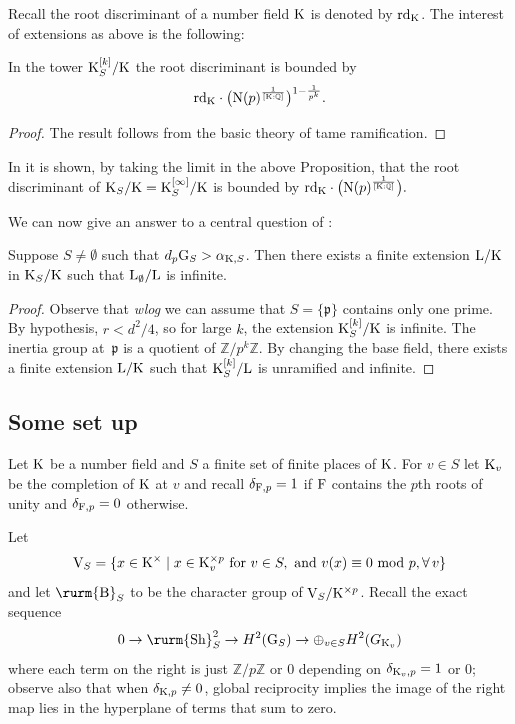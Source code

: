 \documentclass[12pt,a4paper,twoside,english]{smfart}
\def\Q{{\mathbb Q}}
\def\Z{{\mathbb Z}}
\def\p{{\mathfrak p}}
\def\sha{{{\textnormal{\rurm{Sh}}}}}
\def\CyB{{{\textnormal{\rurm{B}}}}}
\def\N{{\rm N}}
\def\G{{\rm G}}
\def\K{{\rm K}}
\def\L{{\rm L}}
\def\F{{\rm F}}
\def\V{{\rm V}}
\def\rd{{\rm rd}}
\begin{document}
  
Recall the root discriminant of a number field $\K$ is denoted by  $\rd_\K$.
  The interest of extensions as above is the following:
  
  \begin{prop}
  In the tower $\K_S^{[k]}/\K$ the root discriminant is bounded by $$\rd_\K \cdot  \big(\N(\p)^{\frac{1}{[\K:\Q]}}\big)^{1-\frac{1}{p^{k}}}.$$  
  \end{prop}
  
\begin{proof}    The result follows from the basic theory of tame ramification.
\end{proof}  
  In
  \cite{Hajir-Maire-Compositio} it is shown, by taking the limit in the above Proposition, that the root discriminant of
  $\K_S/\K= \K_S^{[\infty]}/\K$
   is bounded by $\rd_\K \cdot  \big(\N(\p)^{\frac{1}{[\K:\Q]}}\big).$  


  
 
 We can now give  an answer to a central question of \cite{Hajir-Maire-JA}:
 
 \smallskip
 
\begin{theo}\label{theorem:unramifiedsubtower}
Suppose  $S\neq \emptyset$ such that $d_p \G_S  > \alpha_{\K,S}$. Then there exists a finite extension  $\L/\K$ in $\K_S/\K$ such that $\L_\emptyset/\L$ is infinite. 
\end{theo}  
  
 
  \begin{proof} Observe that {\it wlog} we can assume that $S=\{\p\}$ contains only one prime.
  By hypothesis, $r<d^2/4$, so for large $k$, the extension $\K_S^{[k]}/\K$ is infinite. The  inertia  group  at~$\p$ is a quotient of $\Z/p^k\Z$. By changing the base field, there exists a finite extension $\L/\K$ such that $\K_S^{[k]}/\L$ is unramified and infinite.
\end{proof}

  
  
  
  
   \subsection{Some set up}
  

Let $\K$ be a number field and $S$ a finite set of  finite  places of $\K$. For $v\in S$ let $\K_v$ be the completion
of $\K$ at $v$ and recall $\delta_{\F,p}=1$ if $\F$ contains  the $p$th roots of unity and
$\delta_{\F,p}=0$ otherwise.


\smallskip
Let $$\V_{S} =\{x \in \K^\times \mid x \in \K^{\times p}_v \mbox{ for } v\in S, \  \mbox{and } v(x) \equiv 0\mbox{ mod } p ,\forall \, v \}$$
and let  $\CyB_S$ to be the character group of $\V_{S}/\K^{\times p}$.
Recall the exact sequence
$$ 0\to \sha^2_S \to H^2(\G_S) \to \oplus_{v\in S}H^2(G_{\K_v})$$
where each term on the right is just  $\Z/p\Z$ or $0$ depending on $\delta_{\K_v,p}=1$ or $0$; observe also that  when $\delta_{\K,p} \neq 0$,  global reciprocity implies
the image of the right map lies in the hyperplane of terms that sum to zero.
\end{document}
